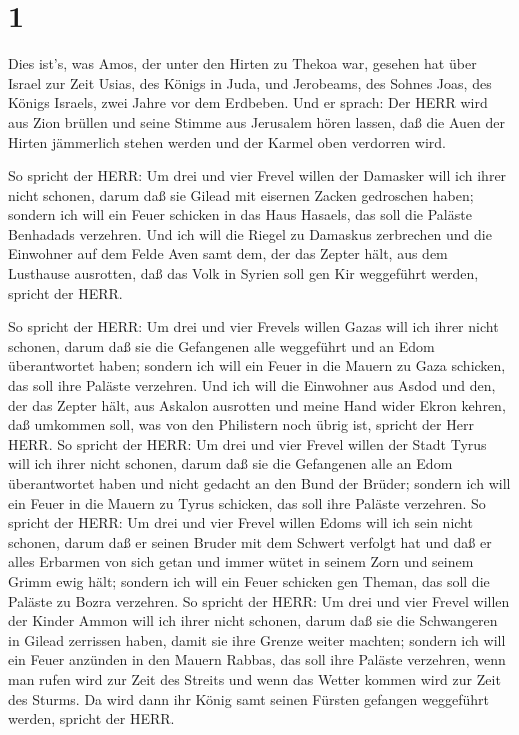 \hypertarget{section}{%
\section{1}\label{section}}

 Dies ist's, was Amos, der unter den Hirten zu Thekoa war,
gesehen hat über Israel zur Zeit Usias, des Königs in Juda, und
Jerobeams, des Sohnes Joas, des Königs Israels, zwei Jahre vor dem
Erdbeben.  Und er sprach: Der HERR wird aus Zion brüllen und
seine Stimme aus Jerusalem hören lassen, daß die Auen der Hirten
jämmerlich stehen werden und der Karmel oben verdorren wird.

 So spricht der HERR: Um drei und vier Frevel willen der
Damasker will ich ihrer nicht schonen, darum daß sie Gilead mit eisernen
Zacken gedroschen haben;  sondern ich will ein Feuer
schicken in das Haus Hasaels, das soll die Paläste Benhadads verzehren.
 Und ich will die Riegel zu Damaskus zerbrechen und die
Einwohner auf dem Felde Aven samt dem, der das Zepter hält, aus dem
Lusthause ausrotten, daß das Volk in Syrien soll gen Kir weggeführt
werden, spricht der HERR.

 So spricht der HERR: Um drei und vier Frevels willen Gazas
will ich ihrer nicht schonen, darum daß sie die Gefangenen alle
weggeführt und an Edom überantwortet haben;  sondern ich
will ein Feuer in die Mauern zu Gaza schicken, das soll ihre Paläste
verzehren.  Und ich will die Einwohner aus Asdod und den,
der das Zepter hält, aus Askalon ausrotten und meine Hand wider Ekron
kehren, daß umkommen soll, was von den Philistern noch übrig ist,
spricht der Herr HERR.  So spricht der HERR: Um drei und
vier Frevel willen der Stadt Tyrus will ich ihrer nicht schonen, darum
daß sie die Gefangenen alle an Edom überantwortet haben und nicht
gedacht an den Bund der Brüder;  sondern ich will ein Feuer
in die Mauern zu Tyrus schicken, das soll ihre Paläste verzehren.
 So spricht der HERR: Um drei und vier Frevel willen Edoms
will ich sein nicht schonen, darum daß er seinen Bruder mit dem Schwert
verfolgt hat und daß er alles Erbarmen von sich getan und immer wütet in
seinem Zorn und seinem Grimm ewig hält;  sondern ich will
ein Feuer schicken gen Theman, das soll die Paläste zu Bozra verzehren.
 So spricht der HERR: Um drei und vier Frevel willen der
Kinder Ammon will ich ihrer nicht schonen, darum daß sie die Schwangeren
in Gilead zerrissen haben, damit sie ihre Grenze weiter machten;
 sondern ich will ein Feuer anzünden in den Mauern Rabbas,
das soll ihre Paläste verzehren, wenn man rufen wird zur Zeit des
Streits und wenn das Wetter kommen wird zur Zeit des Sturms.
 Da wird dann ihr König samt seinen Fürsten gefangen
weggeführt werden, spricht der HERR.

